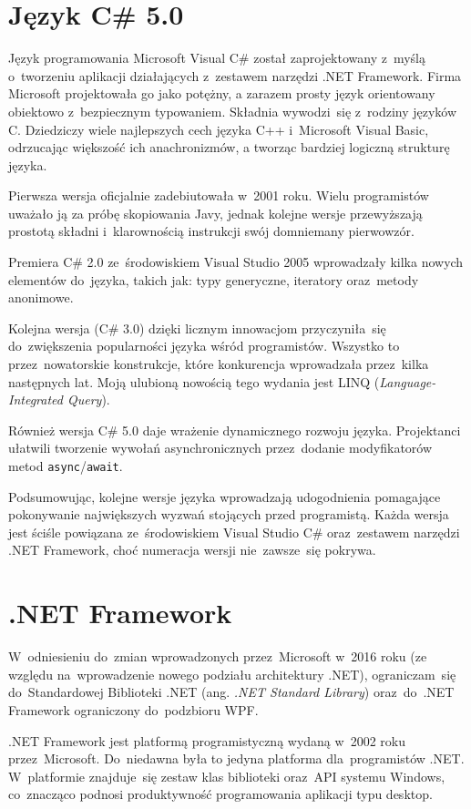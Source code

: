 \documentclass[a4paper,twoside,titlepage,openright]{book}
\begin{document}
\section{Język C\# 5.0}
Język programowania Microsoft Visual C\# został zaprojektowany z~myślą o~tworzeniu aplikacji działających z~zestawem narzędzi .NET Framework. Firma Microsoft projektowała go jako potężny, a zarazem prosty język orientowany obiektowo z~bezpiecznym typowaniem.\cite{csharp} Składnia wywodzi~się z~rodziny języków C. Dziedziczy wiele najlepszych cech języka C++ i~Microsoft Visual Basic, odrzucając większość ich anachronizmów, a tworząc bardziej logiczną strukturę języka. 

Pierwsza wersja oficjalnie zadebiutowała w~2001 roku. Wielu programistów uważało ją za próbę skopiowania Javy, jednak kolejne wersje przewyższają prostotą składni i~klarownością instrukcji swój domniemany pierwowzór. 

Premiera C\# 2.0 ze~środowiskiem Visual Studio 2005 wprowadzały kilka nowych elementów do~języka, takich jak: typy generyczne, iteratory oraz~metody anonimowe. 

Kolejna wersja (C\# 3.0) dzięki licznym innowacjom przyczyniła~się do~zwiększenia popularności języka wśród programistów. Wszystko to przez~nowatorskie konstrukcje, które konkurencja wprowadzała przez~kilka następnych lat. Moją ulubioną nowością tego wydania jest LINQ (\textit{Language-Integrated Query}). 

Również wersja C\# 5.0 daje wrażenie dynamicznego rozwoju języka. Projektanci ułatwili tworzenie wywołań asynchronicznych przez~dodanie modyfikatorów metod \texttt{async}/\texttt{await}. 

Podsumowując, kolejne wersje języka wprowadzają udogodnienia pomagające pokonywanie największych wyzwań stojących przed programistą. Każda wersja jest ściśle powiązana ze~środowiskiem Visual Studio C\# oraz~zestawem narzędzi .NET Framework, choć numeracja wersji nie~zawsze~się pokrywa.

\section{.NET Framework}
W~odniesieniu do~zmian wprowadzonych przez~Microsoft w~2016 roku (ze względu na~wprowadzenie nowego podziału architektury .NET), ograniczam~się do~Standardowej Biblioteki .NET (ang. \textit{.NET Standard Library}) oraz~do~.NET Framework ograniczony do~podzbioru WPF.\cite{dotnetArtykul} 

.NET Framework jest platformą programistyczną wydaną w~2002 roku przez~Microsoft. Do~niedawna była to jedyna platforma dla~programistów .NET.\cite{dotnetArtykul}  W~platformie znajduje~się zestaw klas biblioteki oraz~API systemu Windows, co~znacząco podnosi produktywność programowania aplikacji typu desktop. 
\end{document}
